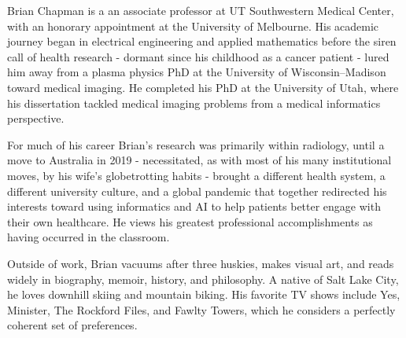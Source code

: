 Brian Chapman is a an associate professor at UT Southwestern Medical Center, with an honorary appointment at the University of Melbourne. His academic journey began in electrical engineering and applied mathematics before the siren call of health research - dormant since his childhood as a cancer patient - lured him away from a plasma physics PhD at the University of Wisconsin–Madison toward medical imaging. He completed his PhD at the University of Utah, where his dissertation tackled medical imaging problems from a medical informatics perspective.
\par\vspace{1em}
For much of his career Brian's research was primarily within radiology, until a move to Australia in 2019 - necessitated, as with most of his many institutional moves, by his wife's globetrotting habits - brought a different health system, a different university culture, and a global pandemic that together redirected his interests toward using informatics and AI to help patients better engage with their own healthcare. He views his greatest professional accomplishments as having occurred in the classroom.
\par\vspace{1em}
Outside of work, Brian vacuums after three huskies, makes visual art, and reads widely in biography, memoir, history, and philosophy. A native of Salt Lake City, he loves downhill skiing and mountain biking. His favorite TV shows include Yes, Minister, The Rockford Files, and Fawlty Towers, which he considers a perfectly coherent set of preferences.